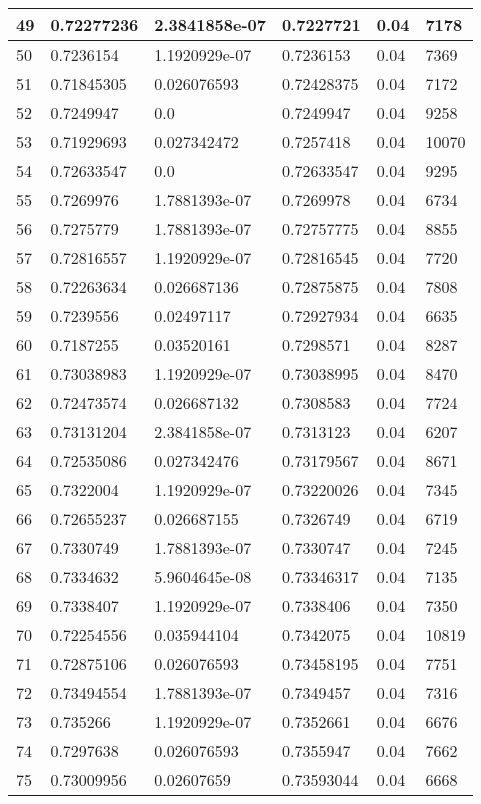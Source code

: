 \begin{longtable}{|l|l|l|l|l|l|}
49 & 0.72277236 & 2.3841858e-07 & 0.7227721 & 0.04 & 7178 \\ \hline 
50 & 0.7236154 & 1.1920929e-07 & 0.7236153 & 0.04 & 7369 \\ \hline 
51 & 0.71845305 & 0.026076593 & 0.72428375 & 0.04 & 7172 \\ \hline 
52 & 0.7249947 & 0.0 & 0.7249947 & 0.04 & 9258 \\ \hline 
53 & 0.71929693 & 0.027342472 & 0.7257418 & 0.04 & 10070 \\ \hline 
54 & 0.72633547 & 0.0 & 0.72633547 & 0.04 & 9295 \\ \hline 
55 & 0.7269976 & 1.7881393e-07 & 0.7269978 & 0.04 & 6734 \\ \hline 
56 & 0.7275779 & 1.7881393e-07 & 0.72757775 & 0.04 & 8855 \\ \hline 
57 & 0.72816557 & 1.1920929e-07 & 0.72816545 & 0.04 & 7720 \\ \hline 
58 & 0.72263634 & 0.026687136 & 0.72875875 & 0.04 & 7808 \\ \hline 
59 & 0.7239556 & 0.02497117 & 0.72927934 & 0.04 & 6635 \\ \hline 
60 & 0.7187255 & 0.03520161 & 0.7298571 & 0.04 & 8287 \\ \hline 
61 & 0.73038983 & 1.1920929e-07 & 0.73038995 & 0.04 & 8470 \\ \hline 
62 & 0.72473574 & 0.026687132 & 0.7308583 & 0.04 & 7724 \\ \hline 
63 & 0.73131204 & 2.3841858e-07 & 0.7313123 & 0.04 & 6207 \\ \hline 
64 & 0.72535086 & 0.027342476 & 0.73179567 & 0.04 & 8671 \\ \hline 
65 & 0.7322004 & 1.1920929e-07 & 0.73220026 & 0.04 & 7345 \\ \hline 
66 & 0.72655237 & 0.026687155 & 0.7326749 & 0.04 & 6719 \\ \hline 
67 & 0.7330749 & 1.7881393e-07 & 0.7330747 & 0.04 & 7245 \\ \hline 
68 & 0.7334632 & 5.9604645e-08 & 0.73346317 & 0.04 & 7135 \\ \hline 
69 & 0.7338407 & 1.1920929e-07 & 0.7338406 & 0.04 & 7350 \\ \hline 
70 & 0.72254556 & 0.035944104 & 0.7342075 & 0.04 & 10819 \\ \hline 
71 & 0.72875106 & 0.026076593 & 0.73458195 & 0.04 & 7751 \\ \hline 
72 & 0.73494554 & 1.7881393e-07 & 0.7349457 & 0.04 & 7316 \\ \hline 
73 & 0.735266 & 1.1920929e-07 & 0.7352661 & 0.04 & 6676 \\ \hline 
74 & 0.7297638 & 0.026076593 & 0.7355947 & 0.04 & 7662 \\ \hline 
75 & 0.73009956 & 0.02607659 & 0.73593044 & 0.04 & 6668 \\ \hline 
\end{longtable}